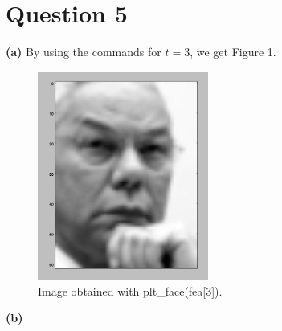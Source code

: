 \documentclass[leqno]{article}
\begin{document}
\hfill
\section*{Question 5} \textbf{(a)} By using the commands for $t = 3$, we get
Figure 1.

\begin{figure}[h!]
\includegraphics[width=0.5\textwidth]{face3}  
\caption{Image obtained with plt\_face(fea[3]).}
\end{figure}

\noindent \textbf{(b)}
\hfill
   
\end{document}

